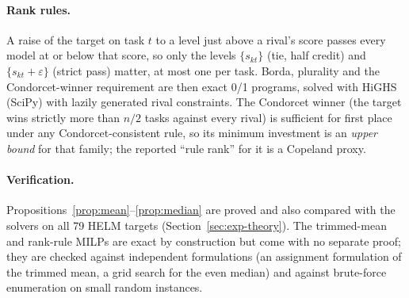 \paragraph{Rank rules.}
A raise of the target on task $t$ to a level just above a rival's score passes every model at or below that score, so only the levels $\{s_{kt}\}$ (tie, half credit) and $\{s_{kt}+\varepsilon\}$ (strict pass) matter, at most one per task. Borda, plurality and the Condorcet-winner requirement are then exact 0/1 programs, solved with HiGHS (SciPy) with lazily generated rival constraints. The Condorcet winner (the target wins strictly more than $n/2$ tasks against every rival) is sufficient for first place under any Condorcet-consistent rule, so its minimum investment is an \emph{upper bound} for that family; the reported ``rule rank'' for it is a Copeland proxy.

\paragraph{Verification.}
Propositions~\ref{prop:mean}--\ref{prop:median} are proved and also compared with the solvers on all 79 HELM targets (Section~\ref{sec:exp-theory}). The trimmed-mean and rank-rule MILPs are exact by construction but come with no separate proof; they are checked against independent formulations (an assignment formulation of the trimmed mean, a grid search for the even median) and against brute-force enumeration on small random instances.

